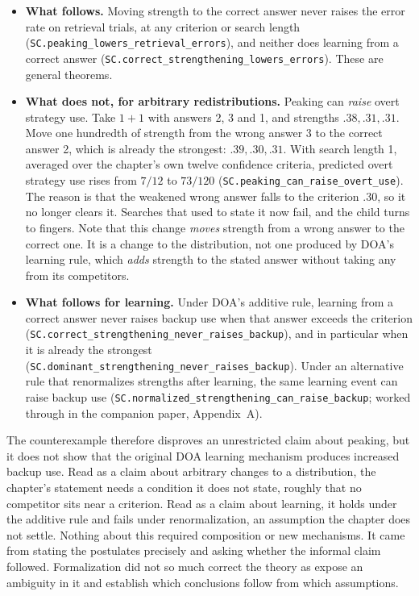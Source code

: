 \documentclass[11pt]{article}
\newcommand{\lean}[1]{\texttt{#1}}
\begin{document}
\begin{itemize}
  \item \textbf{What follows.} Moving strength to the correct answer never raises the error rate on retrieval trials, at any criterion or search length (\lean{SC.peaking\_lowers\_retrieval\_errors}), and neither does learning from a correct answer (\lean{SC.correct\_strengthening\_lowers\_errors}). These are general theorems.
  \item \textbf{What does not, for arbitrary redistributions.} Peaking can \emph{raise} overt strategy use. Take $1+1$ with answers 2, 3 and 1, and strengths $.38, .31, .31$. Move one hundredth of strength from the wrong answer 3 to the correct answer 2, which is already the strongest: $.39, .30, .31$. With search length 1, averaged over the chapter's own twelve confidence criteria, predicted overt strategy use rises from $7/12$ to $73/120$ (\lean{SC.peaking\_can\_raise\_overt\_use}). The reason is that the weakened wrong answer falls to the criterion $.30$, so it no longer clears it. Searches that used to state it now fail, and the child turns to fingers. Note that this change \emph{moves} strength from a wrong answer to the correct one. It is a change to the distribution, not one produced by DOA's learning rule, which \emph{adds} strength to the stated answer without taking any from its competitors.
  \item \textbf{What follows for learning.} Under DOA's additive rule, learning from a correct answer never raises backup use when that answer exceeds the criterion (\lean{SC.correct\_strengthening\_never\_raises\_backup}), and in particular when it is already the strongest (\lean{SC.dominant\_strengthening\_never\_raises\_backup}). Under an alternative rule that renormalizes strengths after learning, the same learning event can raise backup use (\lean{SC.normalized\_strengthening\_can\_raise\_backup}; worked through in the companion paper, Appendix~A).
\end{itemize}

The counterexample therefore disproves an unrestricted claim about peaking, but it does not show that the original DOA learning mechanism produces increased backup use. Read as a claim about arbitrary changes to a distribution, the chapter's statement needs a condition it does not state, roughly that no competitor sits near a criterion. Read as a claim about learning, it holds under the additive rule and fails under renormalization, an assumption the chapter does not settle. Nothing about this required composition or new mechanisms. It came from stating the postulates precisely and asking whether the informal claim followed. Formalization did not so much correct the theory as expose an ambiguity in it and establish which conclusions follow from which assumptions.
\end{document}
